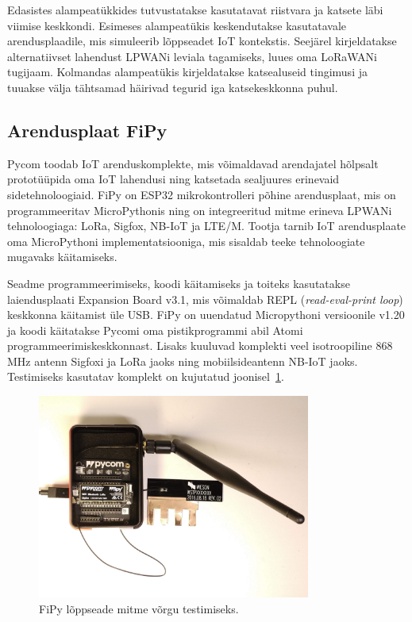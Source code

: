 \documentclass[12pt]{article}
\begin{document}
    Edasistes alampeatükkides tutvustatakse kasutatavat riistvara ja katsete läbi viimise keskkondi.
    Esimeses alampeatükis keskendutakse kasutatavale arendusplaadile, mis simuleerib lõppseadet IoT kontekstis.
    Seejärel kirjeldatakse alternatiivset lahendust LPWANi leviala tagamiseks, luues oma LoRaWANi tugijaam.
    Kolmandas alampeatükis kirjeldatakse katsealuseid tingimusi ja tuuakse välja tähtsamad häirivad tegurid iga katsekeskkonna puhul.

    \subsection{Arendusplaat FiPy}

    Pycom toodab IoT arenduskomplekte, mis võimaldavad arendajatel hõlpsalt prototüüpida oma IoT lahendusi ning katsetada sealjuures erinevaid sidetehnoloogiaid.
    FiPy on ESP32 mikrokontrolleri põhine arendusplaat, mis on programmeeritav MicroPythonis ning on integreeritud mitme erineva LPWANi tehnoloogiaga: LoRa, Sigfox, NB-IoT ja LTE\-/M.
    Tootja tarnib IoT arendusplaate oma MicroPythoni implementatsiooniga, mis sisaldab teeke tehnoloogiate mugavaks käitamiseks.

    Seadme programmeerimiseks, koodi käitamiseks ja toiteks kasutatakse laiendusplaati Expansion Board v3.1, mis võimaldab REPL (\textit{read-eval-print loop}) keskkonna käitamist üle USB.
    FiPy on uuendatud Micropythoni versioonile v1.20 ja koodi käitatakse Pycomi oma pistikprogrammi abil Atomi programmeerimiskeskkonnast.
    Lisaks kuuluvad komplekti veel isotroopiline 868 MHz antenn Sigfoxi ja LoRa jaoks ning mobiilsideantenn NB-IoT jaoks.
    Testimiseks kasutatav komplekt on kujutatud joonisel~\ref{fig:fipy}.

    \begin{figure} [ht] %
        \begin{center}
            \includegraphics[width=0.8\textwidth]{figures/fipy.jpg}
            \caption{FiPy lõppseade mitme võrgu testimiseks.}
            \label{fig:fipy}
        \end{center}
    \end{figure}
\end{document}
